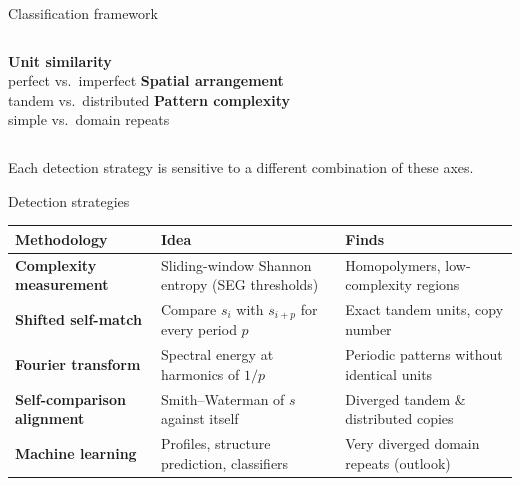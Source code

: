 \documentclass[aspectratio=169,11pt]{beamer}
\newcommand{\muted}[1]{\textcolor{inkmuted}{#1}}
\begin{document}
\begin{frame}{Classification framework}
\centering
\resizebox{0.86\linewidth}{!}{}

\vfill
\begin{columns}[T]
\centering\textbf{Unit similarity}\\\muted{\small perfect vs.\ imperfect}
\centering\textbf{Spatial arrangement}\\\muted{\small tandem vs.\ distributed}
\centering\textbf{Pattern complexity}\\\muted{\small simple vs.\ domain repeats}
\end{columns}
\vfill
\muted{\footnotesize Each detection strategy is sensitive to a different combination of these axes.}
\end{frame}

\begin{frame}{Detection strategies}
\centering\small
\renewcommand{\arraystretch}{1.2}
\begin{tabularx}{\textwidth}{@{}l>{\raggedright\arraybackslash}X>{\raggedright\arraybackslash}X@{}}
\toprule
\textbf{Methodology} & \textbf{Idea} & \textbf{Finds} \\
\midrule
\textcolor{accent2}{\textbf{Complexity measurement}} & Sliding-window Shannon entropy (SEG thresholds) & Homopolymers, low-complexity regions \\
\textcolor{accent}{\textbf{Shifted self-match}} & Compare $s_i$ with $s_{i+p}$ for every period $p$ & Exact tandem units, copy number \\
\textcolor{accent3}{\textbf{Fourier transform}} & Spectral energy at harmonics of $1/p$ & Periodic patterns without identical units \\
\textcolor{accent4}{\textbf{Self-comparison alignment}} & Smith--Waterman of $s$ against itself & Diverged tandem \& distributed copies \\
\muted{\textbf{Machine learning}} & \muted{Profiles, structure prediction, classifiers} & \muted{Very diverged domain repeats (outlook)} \\
\bottomrule
\end{tabularx}
\end{frame}
\end{document}
